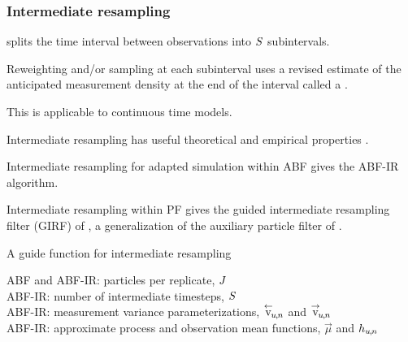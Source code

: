 \documentclass{beamer}
\begin{document}
\begin{frame}
\frametitle{Intermediate resampling}



\begin{myitemize}
\item {} splits the time interval between observations into $S$ subintervals.

\vspace{2mm}

\item Reweighting and/or sampling at each subinterval uses a revised estimate of the anticipated measurement density at the end of the interval called a .

\vspace{2mm}

\item This is applicable to continuous time models.

\vspace{2mm}

\item Intermediate resampling has useful theoretical and empirical properties \citep{delmoral15,park20}.

\vspace{2mm}

\item Intermediate resampling for adapted simulation within ABF gives the ABF-IR algorithm.

\vspace{2mm}

\item Intermediate resampling within PF gives the guided intermediate resampling filter (GIRF) of \citet{park20}, a generalization of the auxiliary particle filter of \citet{pitt99}.
  
\end{myitemize}

\end{frame}


\begin{frame}{A guide function for intermediate resampling}

ABF and ABF-IR:    particles per replicate,  $J$\\
ABF-IR: number of intermediate timesteps, $S$ \\
ABF-IR: measurement variance parameterizations, ${\stackrel{\leftarrow}{\mathrm{v}}\!}_{u{\hspace{-0.25mm},\hspace{-0.2mm}}n}$ and ${\stackrel{\rightarrow}{\mathrm{v}}\!}_{u{\hspace{-0.25mm},\hspace{-0.2mm}}n}$\\
    ABF-IR: approximate process and observation mean functions, $\vec{\mu}$ and $h_{u{\hspace{-0.25mm},\hspace{-0.2mm}}n}$\\


  
\end{frame}
\end{document}

